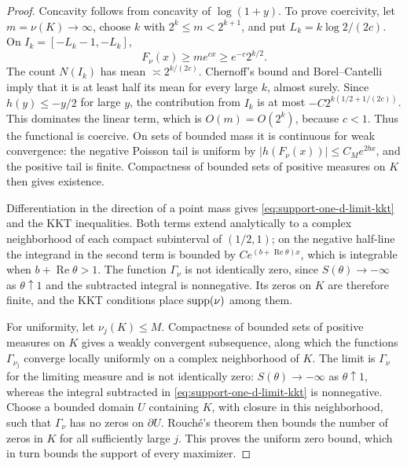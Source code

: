 \begin{proof}
Concavity follows from concavity of \(\log(1+y)\). To prove coercivity, let
\(m=\nu(K)\to\infty\), choose \(k\) with \(2^k\le m<2^{k+1}\), and put
\(L_k=k\log2/(2c)\). On \(I_k=[-L_k-1,-L_k]\),
\[
    F_\nu(x)\ge me^{cx}\ge e^{-c}2^{k/2}.
\]
The count \(N(I_k)\) has mean \(\asymp2^{k/(2c)}\). Chernoff's bound and
Borel--Cantelli imply that it is at least half its mean for every large \(k\),
almost surely. Since \(h(y)\le-y/2\) for large \(y\), the contribution from
\(I_k\) is at most \(-C2^{k(1/2+1/(2c))}\). This dominates the linear term,
which is \(O(m)=O(2^k)\), because \(c<1\). Thus the functional is coercive.
On sets of bounded mass it is continuous for weak convergence: the negative
Poisson tail is uniform by \(|h(F_\nu(x))|\le C_Me^{2bx}\), and the positive
tail is finite. Compactness of bounded sets of positive measures on \(K\)
then gives existence.

Differentiation in the direction of a point mass gives
\eqref{eq:support-one-d-limit-kkt} and the KKT inequalities. Both terms extend
analytically to a complex neighborhood of each compact subinterval of
\((1/2,1)\); on the negative half-line the integrand in the second term is
bounded by \(Ce^{(b+\operatorname{Re}\theta)x}\), which is integrable when
\(b+\operatorname{Re}\theta>1\). The function \(\Gamma_\nu\) is not
identically zero, since \(S(\theta)\to-\infty\) as \(\theta\uparrow1\) and
the subtracted integral is nonnegative. Its zeros on \(K\) are therefore
finite, and the KKT conditions place \(\operatorname{supp}(\nu)\) among them.

For uniformity, let \(\nu_j(K)\le M\). Compactness of bounded sets of positive
measures on \(K\) gives a weakly convergent subsequence, along which the
functions \(\Gamma_{\nu_j}\) converge locally uniformly on a complex
neighborhood of \(K\). The limit is \(\Gamma_\nu\) for the limiting measure
and is not identically zero: \(S(\theta)\to-\infty\) as
\(\theta\uparrow1\), whereas the integral subtracted in
\eqref{eq:support-one-d-limit-kkt} is nonnegative. Choose a bounded
domain \(U\) containing \(K\), with closure in this neighborhood, such that
\(\Gamma_\nu\) has no zeros on \(\partial U\). Rouch\'e's theorem then bounds
the number of zeros in \(K\) for all sufficiently large \(j\). This proves
the uniform zero bound, which in turn bounds the support of every maximizer.
\end{proof}

